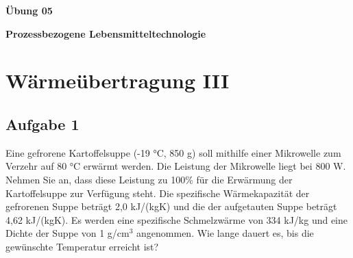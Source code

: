 \documentclass[a4paper,11pt]{article}
\newif\ifshowme
\begin{document}


\bckgrnd


\begin{center}
\LARGE
\color{white}
\textbf{Übung 05} \par \vspace*{2mm}
\large \color{miugray} \textbf{Prozessbezogene Lebensmitteltechnologie}
\end{center}
\par 
\vspace*{6mm}


\color{miudiutex}

\section{Wärmeübertragung III}


\subsection*{Aufgabe 1}
Eine gefrorene Kartoffelsuppe (-19 °C, 850 g) soll mithilfe einer Mikrowelle zum Verzehr auf
80 °C erwärmt werden. Die Leistung der Mikrowelle liegt bei 800 W. Nehmen Sie an, dass
diese Leistung zu 100\% für die Erwärmung der Kartoffelsuppe zur Verfügung steht.
Die spezifische Wärmekapazität der gefrorenen Suppe beträgt 2,0 kJ/(kgK) und die der
aufgetauten Suppe beträgt 4,62 kJ/(kgK). Es werden eine spezifische Schmelzwärme von 334
kJ/kg und eine Dichte der Suppe von 1 g/cm$^3$ angenommen. \pp
Wie lange dauert es, bis die gewünschte Temperatur erreicht ist?

\ifshowme
\antwort{
\begin{align*}
Q &= m \cdot c \cdot \Delta T \\
Q &= 0,85~\text{kg} \cdot 2 ~\text{kJ/kgK} \cdot 19 ~\text{K} + 0,85~\text{kg} \cdot 334 ~\text{kJ/kg} 
\\&~~~ + 0,85~\text{kg} \cdot 4,62 ~\text{kJ/kgK} \cdot 80 ~\text{K}\\
	&= 630,36 ~\text{kJ}  \\
	&= 630.360,0 ~\text{Ws } && | : 800 ~\text{W} \\
	&= 787.95~\text{s} \\
	&\approx 13~\text{min}~ 8~\text{s}
\end{align*}

}
\pagebreak
\else
\fi
\end{document}
